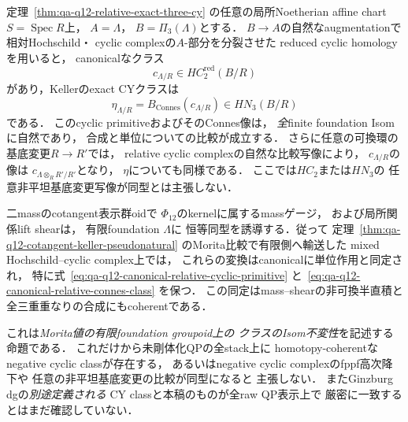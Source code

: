 \begin{proposition}
\label{prop:qa-q12-exact-cy-primitive-isom-inertia}
定理~\ref{thm:qa-q12-relative-exact-three-cy}
の任意の局所Noetherian affine chart
$S=\operatorname{Spec}R$上，
$A=\Lambda$，
$B=\Pi_3(\Lambda)$とする．
$B\to A$の自然なaugmentationで相対Hochschild・
cyclic complexの$A$-部分を分裂させた
reduced cyclic homologyを用いると，
canonicalなクラス
\[
 c_{\Lambda/R}\in HC^{\mathrm{red}}_2(B/R)
 \tag{CP}\label{eq:qa-q12-canonical-relative-cyclic-primitive}
\]
があり，Kellerのexact CYクラスは
\[
 \eta_{\Lambda/R}
   =B_{\mathrm{Connes}}(c_{\Lambda/R})
   \in HN_3(B/R)
 \tag{CB}\label{eq:qa-q12-canonical-relative-connes-class}
\]
である．
このcyclic primitiveおよびそのConnes像は，
\emph{全}finite foundation Isomに自然であり，
合成と単位についての比較が成立する．
さらに任意の可換環の基底変更$R\to R'$では，
relative cyclic complexの自然な比較写像により，
$c_{\Lambda/R}$の像は
$c_{\Lambda\otimes_RR'/R'}$となり，
$\eta$についても同様である．
ここでは$HC_2$または$HN_3$の
任意非平坦基底変更写像が同型とは主張しない．

二massのcotangent表示群oidで
$\Phi_{12}$のkernelに属するmassゲージ，
および局所関係lift shearは，
有限foundation $\Lambda$に
恒等同型を誘導する．従って
定理~\ref{thm:qa-q12-cotangent-keller-pseudonatural}
のMorita比較で有限側へ輸送した
mixed Hochschild--cyclic complex上では，
これらの変換はcanonicalに単位作用と同定され，
特に式~\eqref{eq:qa-q12-canonical-relative-cyclic-primitive}
と~\eqref{eq:qa-q12-canonical-relative-connes-class}
を保つ．
この同定はmass--shearの非可換半直積と
全三重重なりの合成にもcoherentである．

これは\emph{Morita値の有限foundation groupoid上の
クラスのIsom不変性}を記述する命題である．
これだけから未剛体化QPの全stack上に
homotopy-coherentなnegative cyclic classが存在する，
あるいはnegative cyclic complexのfppf高次降下や
任意の非平坦基底変更の比較が同型になると
主張しない．
またGinzburg dgの\emph{別途定義される}
CY classと本稿のものが全raw QP表示上で
厳密に一致するとはまだ確認していない．
\end{proposition}
